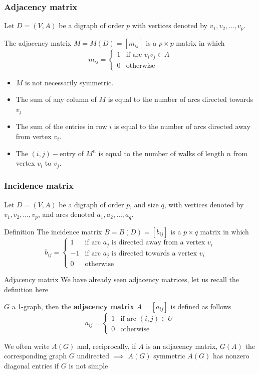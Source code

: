 \documentclass[aspectratio=169]{beamer}
\begin{document}
\begin{frame}\frametitle{Adjacency matrix}
	Let $D=(V,A)$ be a digraph of order $p$ with vertices denoted by $v_1, v_2, \dots , v_p$.
	\begin{definition}
	The adjacency matrix $M=M(D)=[m_{ij}]$ is a $p\times p$ matrix in which
	$$m_{ij}=\left \{ 
	\begin{array}{cl}
	1 & \textrm{if arc } v_iv_j \in A\\
	0 & \textrm{otherwise}
	\end{array}
	\right .
	$$
	\end{definition}
	\begin{theorem}[{Properties}]
	\begin{itemize}
	\item $M$ is not necessarily symmetric.
	\item The sum of any column of $M$ is equal to the number of arcs directed towards $v_j$
	\item The sum of the entries in row $i$ is equal to the number of arcs directed away from vertex $v_i$.
	\item The $(i,j)-$entry of $M^n$ is equal to the number of walks of length $n$ from vertex $v_i$ to $v_j$.
	\end{itemize}
	\end{theorem}
\end{frame}
	
\begin{frame}\frametitle{Incidence matrix}
	Let $D=(V,A)$ be a digraph of order $p$, and size $q$, with vertices denoted by $v_1, v_2, \dots , v_p$, and arcs denoted $a_1, a_2, \dots , a_q$.
	\begin{definition}{Definition}
	The incidence matrix $B=B(D)=[b_{ij}]$ is a $p\times q$ matrix in which
	$$b_{ij}=\left \{ 
	\begin{array}{cl}
	1 & \textrm{if arc } a_j  \textrm{ is directed away from a vertex } v_i\\
	-1 & \textrm{if arc } a_j  \textrm{ is directed towards a vertex } v_i\\
	0 & \textrm{otherwise}
	\end{array}
	\right .
	$$
	\end{definition}
\end{frame}
	
	
	
	
\begin{frame}{Adjacency matrix}
	We have already seen adjacency matrices, let us recall the definition here
	\begin{definition}
		$G$ a 1-graph, then the \textbf{adjacency matrix} $A=[a_{ij}]$ is defined as follows
		\[
		a_{ij} = \begin{cases}
			1 & \text{if arc } (i,j)\in U\\
			0 & \text{otherwise}
		\end{cases}
		\]
	\end{definition}
	\vfill
	We often write $A(G)$ and, reciprocally, if $A$ is an adjacency matrix, $G(A)$ the corresponding graph
	\vfill
	$G$ undirected $\implies$ $A(G)$ symmetric
	\vfill
	$A(G)$ has nonzero diagonal entries if $G$ is not simple
\end{frame}
\end{document}
